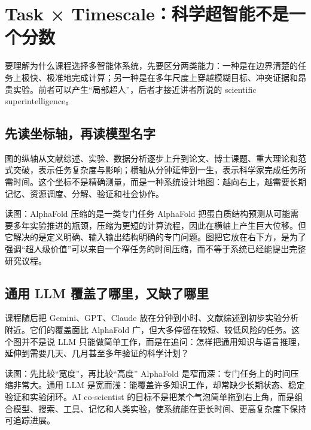 \section{Task × Timescale：科学超智能不是一个分数}

要理解为什么课程选择多智能体系统，先要区分两类能力：一种是在边界清楚的任务上极快、极准地完成计算；另一种是在多年尺度上穿越模糊目标、冲突证据和昂贵实验。前者可以产生“局部超人”，后者才接近讲者所说的 scientific superintelligence。

\subsection{先读坐标轴，再读模型名字}

图的纵轴从文献综述、实验、数据分析逐步上升到论文、博士课题、重大理论和范式突破，表示任务复杂度与影响；横轴从分钟延伸到一生，表示科学家完成任务所需时间。这个坐标不是精确测量，而是一种系统设计地图：越向右上，越需要长期记忆、资源调度、分解、验证和社会协作。


\begin{knowledgebox}{读图：AlphaFold 压缩的是一类专门任务}
AlphaFold 把蛋白质结构预测从可能需要多年实验推进的瓶颈，压缩为更短的计算流程，因此在横轴上产生巨大位移。但它解决的是定义明确、输入输出结构明确的专门问题。图把它放在右下方，是为了强调“超人级价值”可以来自一个窄任务的时间压缩，而不等于系统已经能提出完整研究议程。
\end{knowledgebox}


\subsection{通用 LLM 覆盖了哪里，又缺了哪里}

课程随后把 Gemini、GPT、Claude 放在分钟到小时、文献综述到初步实验分析附近。它们的覆盖面比 AlphaFold 广，但大多停留在较短、较低风险的任务。这个图并不是说 LLM 只能做简单工作，而是在追问：怎样把通用知识与语言推理，延伸到需要几天、几月甚至多年验证的科学计划？


\begin{knowledgebox}{读图：先比较“宽度”，再比较“高度”}
AlphaFold 是窄而深：专门任务上的时间压缩非常大。通用 LLM 是宽而浅：能覆盖许多知识工作，却常缺少长期状态、稳定验证和实验闭环。AI co-scientist 的目标不是把某个气泡简单拖到右上角，而是组合模型、搜索、工具、记忆和人类实验，使系统能在更长时间、更高复杂度下保持可追踪进展。
\end{knowledgebox}

